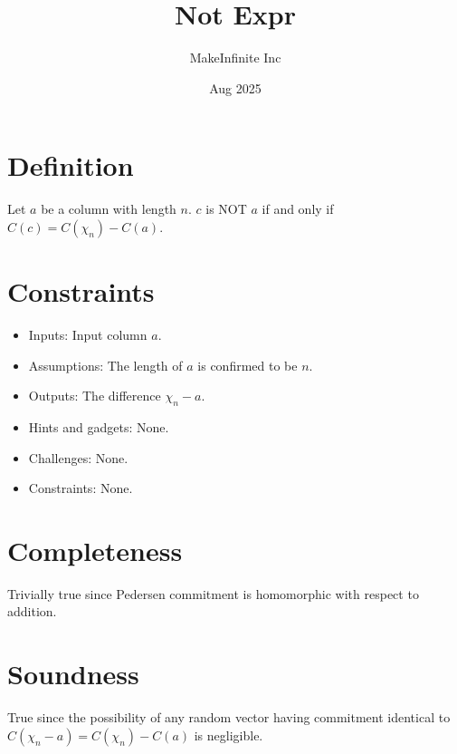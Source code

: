 \documentclass[11pt]{article}
\title{Not Expr}
\author{MakeInfinite Inc}
\date{Aug 2025}
\begin{document}
\maketitle

\section{Definition}
\noindent Let $a$ be a column with length $n$. $c$ is NOT $a$ if and only if $C(c) = C(\chi_n) - C(a)$.
\section{Constraints}
\begin{itemize}
    \item Inputs: Input column $a$.
    \item Assumptions: The length of $a$ is confirmed to be $n$.
    \item Outputs: The difference $\chi_n - a$.
    \item Hints and gadgets: None.
    \item Challenges: None.
    \item Constraints: None.
\end{itemize}
\section{Completeness}
Trivially true since Pedersen commitment is homomorphic with respect to addition.
\section{Soundness}
True since the possibility of any random vector having commitment identical to $C(\chi_n-a) = C(\chi_n) - C(a)$ is negligible.
\end{document}
